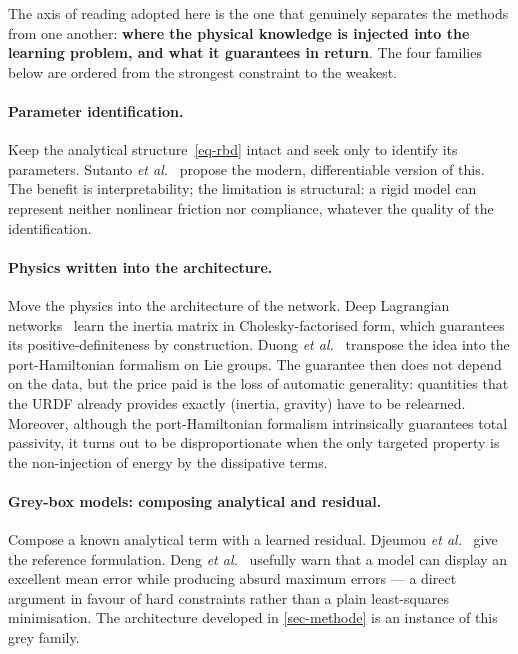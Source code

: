\documentclass[a4paper, oneside]{article}
\begin{document}
The axis of reading adopted here is the one that genuinely separates the
methods from one another: \textbf{where the physical knowledge is injected into
the learning problem, and what it guarantees in return}. The four families
below are ordered from the strongest constraint to the weakest.

\paragraph{Parameter identification.}
Keep the analytical structure~\eqref{eq-rbd} intact and seek only to identify
its parameters. Sutanto \emph{et al.}~\cite{sutanto2020} propose the modern,
differentiable version of this. The benefit is interpretability; the limitation
is structural: a rigid model can represent neither nonlinear friction nor
compliance, whatever the quality of the identification.

\paragraph{Physics written into the architecture.}
Move the physics into the architecture of the network. Deep Lagrangian
networks~\cite{lutter2019iclr} learn the inertia matrix in Cholesky-factorised
form, which guarantees its positive-definiteness by construction. Duong
\emph{et al.}~\cite{duong2024} transpose the idea into the port-Hamiltonian
formalism on Lie groups. The guarantee then does not depend on the data, but
the price paid is the loss of automatic generality: quantities that the URDF
already provides exactly (inertia, gravity) have to be relearned. Moreover,
although the port-Hamiltonian formalism intrinsically guarantees total
passivity, it turns out to be disproportionate when the only targeted property
is the non-injection of energy by the dissipative terms.

\paragraph{Grey-box models: composing analytical and residual.}
Compose a known analytical term with a learned residual. Djeumou
\emph{et al.}~\cite{djeumou2022} give the reference formulation. Deng
\emph{et al.}~\cite{deng2024} usefully warn that a model can display an
excellent mean error while producing absurd maximum errors --- a direct
argument in favour of hard constraints rather than a plain least-squares
minimisation. The architecture developed in \cref{sec-methode} is an instance
of this grey family.
\end{document}
